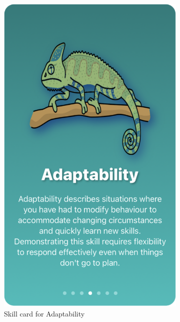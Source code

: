 \documentclass{l4proj}
\begin{document}
\begin{appendices}
\begin{figure}[H]
\begin{subfigure}[b]{0.3\textwidth}
        \includegraphics[scale=0.25]{images/AdaptabilityCard.pdf}
        \caption{Skill card for Adaptability}
        \label{fig:AdaptabilityCard}
    \end{subfigure}
    \begin{subfigure}[b]{0.3\textwidth}

\end{subfigure}
\end{figure}
\end{appendices}
\end{document}
